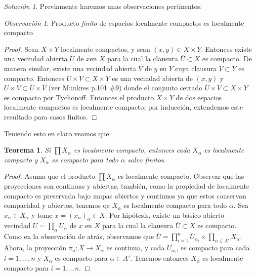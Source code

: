 \documentclass[notitlepage]{report}
\newtheorem{thm}{Teorema}
\theoremstyle{definition}
\theoremstyle{remark}
\newtheorem*{rem}{Observación}
\newtheorem*{sol}{Solución}
\begin{document}
\begin{sol}
	Previamente haremos unas observaciones pertinentes:
	\begin{rem}
		Producto \emph{finito} de espacios localmente compactos es localmente compacto
	\end{rem}
	\begin{proof}
		Sean $ X \times Y $ localmente compactos, y sean $ (x,y) \in X \times Y $. Entonces existe una vecindad abierta $ U $ de $ x  $en $ X $ para la cual la clausura $ \overline{U} \subset X $ es compacto. De manera similar, existe una vecindad abierta $ V $ de $ y $ en $ Y $ cuya clausura $ \overline{V} \subset Y $  es compacto. Entonces $ U \times V \subset X \times Y $ es una vecindad abierta de $ (x,y) $ y $  U \times V \subset \overline{U} \times \overline{V} $ (ver Munkres p.101 \#9) donde el conjunto cerrado $  \overline{U} \times \overline{V} \subset X \times Y $ es compacto por Tychonoff. Entonces el producto $ X \times Y $ de dos espacios localmente compactos es localmente compacto; por inducción, extendemos este resultado para casos finitos.
		
	\end{proof}
	Teniendo esto en claro veamos que:
	\begin{thm}
		Si $ \prod X_\alpha $ es localmente compacto, entonces cada $ X_\alpha $ es localmente compacto y $ X_\alpha $ es compacto para todo $ \alpha $ salvo finitos.
	\end{thm}
	\begin{proof}
		Asuma que el producto $ \prod X_\alpha $ es localmente compacto. Observar que las proyecciones son continuas y abiertas, también, como la propiedad de localmente compacto es preservada bajo mapas abiertos y continuos ya que estos conservan compacidad y abiertos, tenemos qe $ X_\alpha  $ es localmente compacto para todo $ \alpha $. Sea $ x_\alpha \in X_\alpha $ y tome $ x = (x_\alpha)_\alpha \in X $. Por hipótesis, existe un básico abierto vecindad $ U = \prod_\alpha U_\alpha $  de $ x $ en $ X $ para la cual la clausura $ \overline{U} \subset X $ es compacto. Como en la observación de atrás, observamos que $  \overline{U} = \prod_{i = 1}^{n} \overline{U}_{\alpha_i} \times \prod_{\alpha \in A'} X_\alpha $. Ahora, la proyección $ \pi_a : X \rightarrow X_\alpha $ es continua, y cada $ \overline{U_{\alpha_i}} $, es compacto para cada $ i = 1, \ldots,n  $ y $ X_\alpha $ es compacto para $ \alpha \in A'  $. Tenemos entonces $ X_\alpha $ es localmente compacto para $ i = 1,\ldots n $.
		

\end{proof}
\end{sol}
\end{document}
